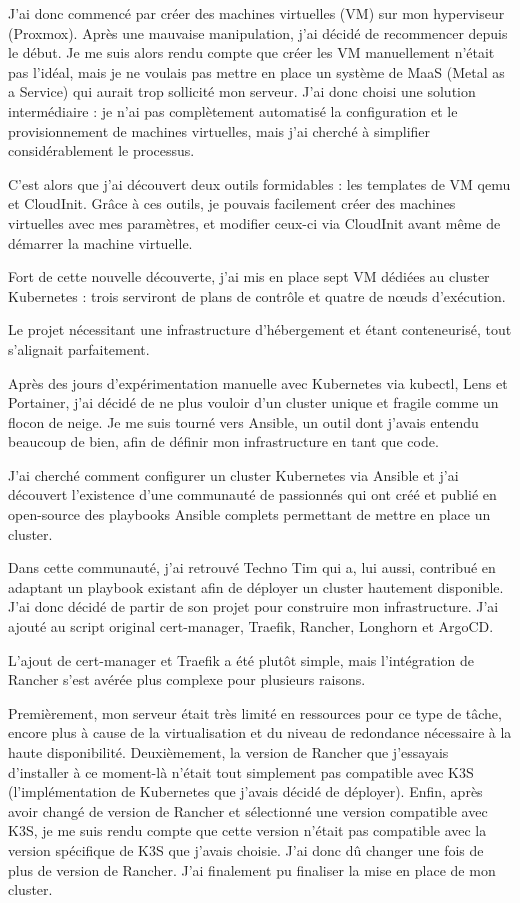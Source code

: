 J'ai donc commencé par créer des machines virtuelles (VM) sur mon hyperviseur (Proxmox).
Après une mauvaise manipulation, j'ai décidé de recommencer depuis le début.
Je me suis alors rendu compte que créer les VM manuellement n'était pas l'idéal,
mais je ne voulais pas mettre en place un système de MaaS (Metal as a Service) qui aurait trop sollicité mon serveur.
J'ai donc choisi une solution intermédiaire : je n'ai pas complètement automatisé la configuration et le provisionnement
de machines virtuelles, mais j'ai cherché à simplifier considérablement le processus.

C'est alors que j'ai découvert deux outils formidables : les templates de VM qemu et CloudInit.
Grâce à ces outils, je pouvais facilement créer des machines virtuelles avec mes paramètres,
et modifier ceux-ci via CloudInit avant même de démarrer la machine virtuelle.

Fort de cette nouvelle découverte, j'ai mis en place sept VM dédiées au cluster Kubernetes :
trois serviront de plans de contrôle et quatre de nœuds d'exécution.

Le projet nécessitant une infrastructure d'hébergement et étant conteneurisé, tout s'alignait parfaitement.

Après des jours d'expérimentation manuelle avec Kubernetes via kubectl, Lens et Portainer, j'ai décidé de ne plus vouloir
d'un cluster unique et fragile comme un flocon de neige.
Je me suis tourné vers Ansible, un outil dont j'avais entendu beaucoup de bien, afin de définir mon infrastructure en tant que code.

J'ai cherché comment configurer un cluster Kubernetes via Ansible et j'ai découvert l'existence d'une communauté de passionnés
qui ont créé et publié en open-source des playbooks Ansible complets permettant de mettre en place un cluster.

Dans cette communauté, j'ai retrouvé Techno Tim qui a, lui aussi, contribué en adaptant un playbook existant
afin de déployer un cluster hautement disponible.
J'ai donc décidé de partir de son projet pour construire mon infrastructure.
J'ai ajouté au script original cert-manager, Traefik, Rancher, Longhorn et ArgoCD\@.

L'ajout de cert-manager et Traefik a été plutôt simple, mais l'intégration de Rancher s'est avérée plus complexe pour plusieurs raisons.

Premièrement, mon serveur était très limité en ressources pour ce type de tâche, encore plus à cause de la virtualisation
et du niveau de redondance nécessaire à la haute disponibilité.
Deuxièmement, la version de Rancher que j'essayais d'installer à ce moment-là n'était tout simplement pas compatible avec K3S
(l'implémentation de Kubernetes que j'avais décidé de déployer).
Enfin, après avoir changé de version de Rancher et sélectionné une version compatible avec K3S,
je me suis rendu compte que cette version n'était pas compatible avec la version spécifique de K3S que j'avais choisie.
J'ai donc dû changer une fois de plus de version de Rancher.
J'ai finalement pu finaliser la mise en place de mon cluster.

